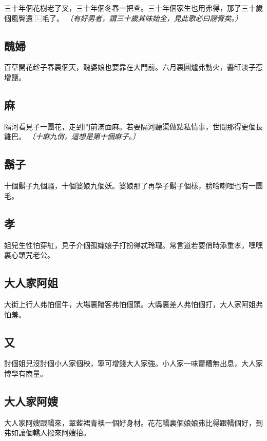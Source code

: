 三十年個花樹老了叉，三十年個冬春一把查。三十年個家生也用弗得，那了三十歲個風臀還𣬿⿺毛了。
\textit{〔有好男者，謂三十歲其味始全，見此歌必曰謗臀矣。〕}

\subsection*{醜婦}

百草開花趁子春裏個天，醜婆娘也要靠在大門前。六月裏圓爐弗動火，醬缸淡子惹增鹽。

\subsection*{麻}

隔河看見子一團花，走到門前滿面麻。若要隔河聽渠做點私情事，世間那得更個長雞巴。
\textit{〔十麻九俏，這想是第十個麻子。〕}

\subsection*{鬍子}

十個鬍子九個騷，十個婆娘九個妖。婆娘那了再學子鬍子個樣，膀哈喇哩也有一團毛。

\subsection*{孝}

姐兒生性怕穿紅，見子介個孤孀娘子打扮得忒玲瓏。常言道若要俏時添重孝，嘿嘿裏心頭咒老公。

\subsection*{大人家阿姐}

大街上行人弗怕個牛，大場裏賭客弗怕個頭。大縣裏差人弗怕個打，大人家阿姐弗怕羞。

\subsection*{又}

討個姐兒沒討個小人家個秧，寧可增錢大人家強。小人家一味齏糟無出息，大人家博學有商量。

\subsection*{大人家阿嫂}

大人家阿嫂跟轎來，翠藍裙青襖一個好身材。花花轎裏個娘娘弗比得跟轎個好，到弗如讓個轎人撥來阿嫂抬。

